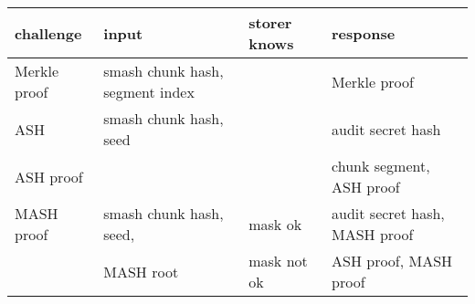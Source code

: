 \documentclass{standalone}
\begin{document}
\begin{tabular}{|l|l|l|l|}
\hline
 \textbf{challenge} & \textbf{input} & \textbf{storer knows} & \textbf{response} \\ \hline \hline
 Merkle proof & smash chunk hash, segment index & & Merkle proof  \\ \cline{1-1} \cline {4-4}
 ASH & smash chunk hash, seed & & audit secret hash \\ \cline{1-1} \cline {4-4}
 ASH proof & & & chunk segment, ASH proof \\ \hline
 MASH proof & smash chunk hash, seed, & mask ok & audit secret hash, MASH proof \\ \cline{3-4}
  & MASH root & mask not ok & ASH proof, MASH proof \\
  \hline
\end{tabular}
\end{document}
